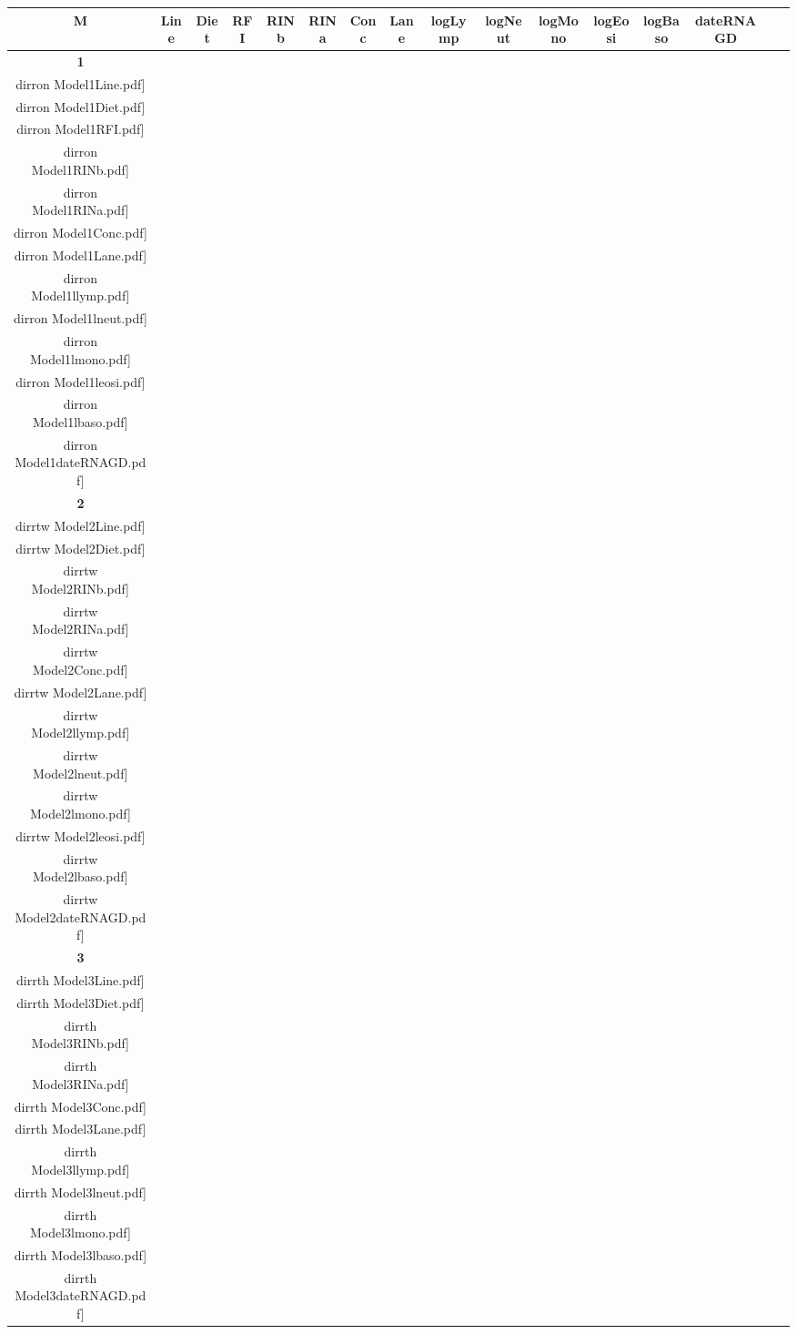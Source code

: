 \documentclass[landscape]{article}
\def \dirron {/run/user/1000/gvfs/smb-share:server=cyfiles.iastate.edu,share=09/22/ntyet/R/RA/Data/Reanalysis Data/resultcbc/Model1.Line.Diet.RFI.RINb.RINa.Conc.Lane.llymp.lneut.lmono.leosi.lbaso.dateRNAGD/}
\def \dirrtw {/run/user/1000/gvfs/smb-share:server=cyfiles.iastate.edu,share=09/22/ntyet/R/RA/Data/Reanalysis Data/resultcbc/Model2.Line.Diet.RINb.RINa.Conc.Lane.llymp.lneut.lmono.leosi.lbaso.dateRNAGD/}
\def \dirrth {/run/user/1000/gvfs/smb-share:server=cyfiles.iastate.edu,share=09/22/ntyet/R/RA/Data/Reanalysis Data/resultcbc/Model3.Line.Diet.RINb.RINa.Conc.Lane.llymp.lneut.lmono.lbaso.dateRNAGD/}
\begin{document}
\begin{table}
\Huge
\centering
\begin{tabular}{cccccccccccccccc}
      {\Huge \textbf{M}} 
      & {\Huge\textbf{ Line}} 
      &{\Huge \textbf{Diet}} 
      & {\Huge \textbf{RFI}}
      &{\Huge\textbf{ RINb}} 
      &{\Huge \textbf{RINa}} 
      &{\Huge \textbf{Conc}} 
      &{\Huge \textbf{Lane}}
      &{\Huge \textbf{logLymp}}
      &{\Huge \textbf{logNeut}}
      &{\Huge \textbf{logMono}}
      &{\Huge \textbf{logEosi}}
      &{\Huge \textbf{logBaso}}
      &{\Huge \textbf{dateRNAGD}}
      \\
      \hline
      
      {\Huge \textbf{1}} 
      &\texttt{[image: \\dirron Model1Line.pdf]}
      &\texttt{[image: \\dirron Model1Diet.pdf]}
      &\texttt{[image: \\dirron Model1RFI.pdf]}
      &\texttt{[image: \\dirron Model1RINb.pdf]}
      &\texttt{[image: \\dirron Model1RINa.pdf]}
      &\texttt{[image: \\dirron Model1Conc.pdf]}
      &\texttt{[image: \\dirron Model1Lane.pdf]}
      &\texttt{[image: \\dirron Model1llymp.pdf]}
      &\texttt{[image: \\dirron Model1lneut.pdf]}
      &\texttt{[image: \\dirron Model1lmono.pdf]}
      &\texttt{[image: \\dirron Model1leosi.pdf]}
      &\texttt{[image: \\dirron Model1lbaso.pdf]}
      &\texttt{[image: \\dirron Model1dateRNAGD.pdf]}
     \\
     \hline
     
      {\Huge \textbf{2}} 
      &\texttt{[image: \\dirrtw Model2Line.pdf]}
      &\texttt{[image: \\dirrtw Model2Diet.pdf]}
      &
      &\texttt{[image: \\dirrtw Model2RINb.pdf]}
      &\texttt{[image: \\dirrtw Model2RINa.pdf]}
      &\texttt{[image: \\dirrtw Model2Conc.pdf]}
      &\texttt{[image: \\dirrtw Model2Lane.pdf]}
      &\texttt{[image: \\dirrtw Model2llymp.pdf]}
      &\texttt{[image: \\dirrtw Model2lneut.pdf]}
      &\texttt{[image: \\dirrtw Model2lmono.pdf]}
      &\texttt{[image: \\dirrtw Model2leosi.pdf]}
      &\texttt{[image: \\dirrtw Model2lbaso.pdf]}
      &\texttt{[image: \\dirrtw Model2dateRNAGD.pdf]}
     \\
     \hline
     
     {\Huge \textbf{3}} 
      &\texttt{[image: \\dirrth Model3Line.pdf]}
      &\texttt{[image: \\dirrth Model3Diet.pdf]}
      &
      &\texttt{[image: \\dirrth Model3RINb.pdf]}
      &\texttt{[image: \\dirrth Model3RINa.pdf]}
      &\texttt{[image: \\dirrth Model3Conc.pdf]}
      &\texttt{[image: \\dirrth Model3Lane.pdf]}
      &\texttt{[image: \\dirrth Model3llymp.pdf]}
      &\texttt{[image: \\dirrth Model3lneut.pdf]}
      &\texttt{[image: \\dirrth Model3lmono.pdf]}
      &
      &\texttt{[image: \\dirrth Model3lbaso.pdf]}
      &\texttt{[image: \\dirrth Model3dateRNAGD.pdf]}
     \\
     \hline
     

\end{tabular}
\end{table}
\end{document}

